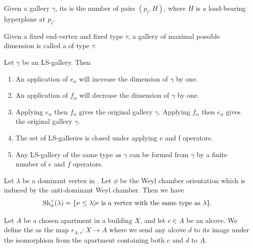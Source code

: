 \documentclass[11pt]{article}
\begin{document}
\begin{definition}
    Given a gallery $\gamma$, its  is the number of pairs $(p_i,H)$, where $H$ is a load-bearing hyperplane at $p_i$. 
\end{definition}

\begin{definition}
    Given a fixed end-vertex and fixed type $\tau$, a gallery of maximal possible dimension is called a  of type $\tau$. 
\end{definition}


\begin{proposition}
    Let $\gamma$ be an LS-gallery. Then
    \begin{enumerate}
        \item An application of $e_\alpha$ will increase the dimension of $\gamma$ by one.
        \item An application of $f_\alpha$ will decrease the dimension of $\gamma$ by one.
        \item Applying $e_\alpha$ then $f_\alpha$ gives the original gallery $\gamma$. Applying $f_\alpha$ then $e_\alpha$ gives the original gallery $\gamma$.
        \item The set of LS-galleries is closed under applying e and f operators.
        \item Any LS-gallery of the same type as $\gamma$ can be formed from $\gamma$ by a finite number of $e$ and $f$ operators.
    \end{enumerate}
\end{proposition}


\begin{proposition}
    Let $\lambda$ be a dominant vertex in \sg. Let $\phi$ be the Weyl chamber orientation which is induced by the anti-dominant Weyl chamber. Then we have
    \[\textnormal{Sh}_\phi^\vee (\lambda)=\{\nu \leq \lambda|\nu \textnormal{ is a vertex with the same type as }\lambda\}.\]
\end{proposition}


\begin{definition}
    Let $A$ be a chosen apartment in a building $X$, and let $c\in A$ be an alcove. We define the  as the map $r_{A,c}:X\longrightarrow A$ where we send any alcove $d$ to its image under the isomorphism from the apartment containing both $c$ and $d$ to $A$. 
\end{definition}
\end{document}
